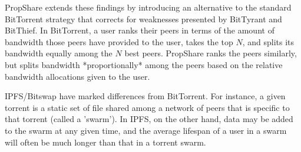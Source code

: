 PropShare extends these findings by introducing an alternative to the standard
BitTorrent strategy that corrects for weaknesses presented by BitTyrant and
BitThief. In BitTorrent, a user ranks their peers in terms of the amount of
bandwidth those peers have provided to the user, takes the top $N$, and splits
its bandwidth equally among the $N$ best peers. PropShare ranks the peers similarly,
but splits bandwidth *proportionally* among the peers based on the relative
bandwidth allocations given to the user.

IPFS/Bitswap have marked differences from BitTorrent. For instance, a given
torrent is a static set of file shared among a network of peers that is specific
to that torrent (called a 'swarm'). In IPFS, on the other hand, data may be added
to the swarm at any given time, and the average lifespan of a user in a swarm
will often be much longer than that in a torrent swarm.
